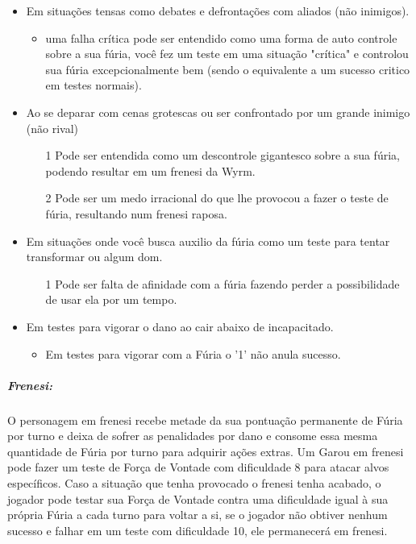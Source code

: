 \begin{itemize}
    \item  Em situações tensas como debates e defrontações com aliados (não inimigos).
    \begin{itemize}[noitemsep]
        \item uma falha crítica pode ser entendido como uma forma de auto controle sobre a sua fúria, você fez um teste em uma situação "crítica" e controlou sua fúria excepcionalmente bem (sendo o equivalente a um sucesso critico em testes normais).
    \end{itemize}
    
    \item  Ao se deparar com cenas grotescas ou ser confrontado por um grande inimigo (não rival)
    \begin{itemize}[noitemsep]
        \item[1] Pode ser entendida como um descontrole gigantesco sobre a sua fúria, podendo resultar em um frenesi da Wyrm.
        
        \item[2] Pode ser um medo irracional do que lhe provocou a fazer o teste de fúria, resultando num frenesi raposa.
    \end{itemize}
    
    \item  Em situações onde você busca auxilio da fúria como um teste para tentar transformar ou algum dom.
    \begin{itemize}[noitemsep]
        \item[1] Pode ser falta de afinidade com a fúria fazendo perder a possibilidade de usar ela por um tempo.
    \end{itemize}
    
    \item  Em testes para vigorar o dano ao cair abaixo de incapacitado.
    \begin{itemize}[noitemsep]
        \item Em testes para vigorar com a Fúria o '1' não anula sucesso.
    \end{itemize}
\end{itemize}

\subparagraph{\bf Frenesi:}
O personagem em frenesi recebe metade da sua pontuação permanente de Fúria por turno e deixa de sofrer as penalidades por dano e consome essa mesma quantidade de Fúria por turno para adquirir ações extras. Um Garou em frenesi pode fazer um teste de Força de Vontade com dificuldade 8 para atacar alvos específicos.
Caso a situação que tenha provocado o frenesi tenha acabado, o jogador pode testar sua Força de Vontade contra uma dificuldade igual à sua própria Fúria a cada turno para voltar a si, se o jogador não obtiver nenhum sucesso e falhar em um teste com dificuldade 10, ele permanecerá em frenesi. 

